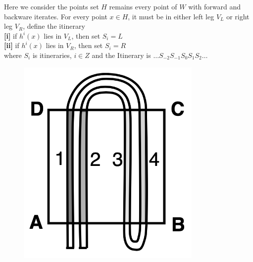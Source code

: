 \documentclass[12pt]{article}
\theoremstyle{plain}
\begin{document}
Here we consider the points set $H$ remains every point of $W$ with forward and backware iterates. For every point $x \in H$, it must be in either left leg $V_L$ or right leg $V_R$, define the itinerary
\\\noindent \textbf{[i]} if $h^i(x)$ lies in $V_L$, then set $S_i = L$
\\\noindent \textbf{[ii]} if $h^i(x)$ lies in $V_R$, then set $S_i = R$
\\\noindent where $S_i$ is itineraries, $i \in Z$ and the Itinerary is $\ldots S_{-2}S_{-1}S_0S_1S_2 \ldots$\\[6ex]


\begin{figure}[H]
\begin{minipage}[c][0.24\width]{
   0.24\textwidth}
   \centering
   \includegraphics[width=0.8\textwidth]{figure/section5/horseshoe-2-1.png}
\end{minipage}
\begin{minipage}[c][0.24\width]{
   0.24\textwidth}
   \centering

\end{minipage}
\end{figure}
\end{document}
